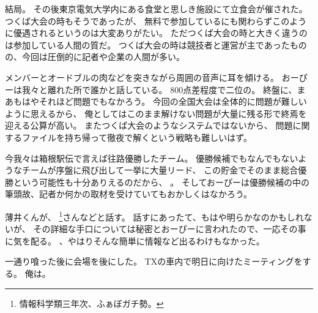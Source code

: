 結局。
その後東京電気大学内にある食堂と思しき施設にて立食会が催された。
つくば大会の時もそうであったが、
無料で参加しているにも関わらずこのように優遇されるというのは大変ありがたい。
ただつくば大会の時と大きく違うのは参加している人間の質だ。
つくば大会の時は競技者と運営が主であったものの、今回は圧倒的に記者や企業の人間が多い。

メンバーとオードブルの肉などを突きながら周囲の音声に耳を傾ける。
おーぴーは我々と離れた所で誰かと話している。
800点差程度で二位の。
終盤に、まあもはやそれほど問題でもなかろう。
今回の全国大会は全体的に問題が難しいように思えるから、
俺としてはこのまま解けない問題が大量に残る形で終焉を迎える公算が高い。
またつくば大会のようなシステムではないから、
問題に関するファイルを持ち帰って徹夜で解くという戦略も難しいはず。

今我々は箱根駅伝で言えば往路優勝したチーム。
優勝候補でもなんでもないようなチームが序盤に飛び出して一挙に大量リード、
この貯金でそのまま総合優勝という可能性も十分ありえるのだから、
。
そしておーぴーは優勝候補の中の筆頭故、記者か何かの取材を受けていてもおかしくはなかろう。

薄井くんが、
\footnote{情報科学類三年次、ふぁぼガチ勢。}さんなどと話す。
話すにあったて、もはや明らかなのかもしれないが、
その詳細な手口については秘密とおーぴーに言われたので、一応その事に気を配る。
、やはりそんな簡単に情報など出るわけもなかった。

一通り喰った後に会場を後にした。
TXの車内で明日に向けたミーティングをする。
俺は。
